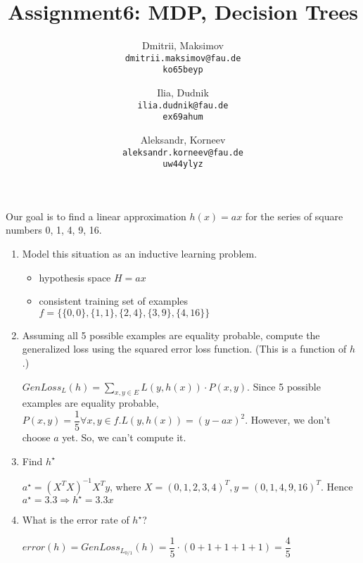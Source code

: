 \documentclass{homework}
\title{Assignment6: MDP, Decision Trees}
\author{
  Dmitrii, Maksimov\\
  \texttt{dmitrii.maksimov@fau.de} \\
  \texttt{ko65beyp}
  \and
  Ilia, Dudnik\\
  \texttt{ilia.dudnik@fau.de}\\
  \texttt{ex69ahum}
  \and
  Aleksandr, Korneev\\
  \texttt{aleksandr.korneev@fau.de}\\
  \texttt{uw44ylyz}
}
\begin{document}
\maketitle

\exercise[6.3 (Loss)]
Our goal is to find a linear approximation $h(x) = ax$ for the series of square numbers 0, 1, 4, 9, 16.
\begin{enumerate}
	\item Model this situation as an inductive learning problem.
	\begin{itemize}
		\item hypothesis space $H = ax$
		\item consistent training set of examples $f = \{\{0, 0\},\{1, 1\},\{2, 4\},\{3, 9\},\{4, 16\}\}$
	\end{itemize}
	\item Assuming all 5 possible examples are equality probable, compute the generalized loss using the squared error loss function. (This is a function of $h$.)
	
	$GenLoss_L(h)=\sum_{x,y\in E} L(y, h(x))\cdot P(x,y)$. Since 5 possible examples are equality probable, $P(x,y)=\dfrac{1}{5} \forall x,y \in f. L(y, h(x)) = (y-ax)^2$. However, we don't choose $a$ yet. So, we can't compute it.
	\item Find $h^{\star}$

	$a^{\star} = (X^TX)^{-1}X^Ty$, where $X = (0, 1, 2, 3, 4)^T, y=(0, 1,4,9,16)^T$. \newline Hence $a^{\star} = 3.3 \Rightarrow h^{\star}=3.3x$
	\item What is the error rate of $h^{\star}$?

	$error(h)=GenLoss_{L_{0/1}}(h)=\dfrac{1}{5}\cdot(0+1+1+1+1) = \dfrac{4}{5}$
\end{enumerate}
\end{document}
